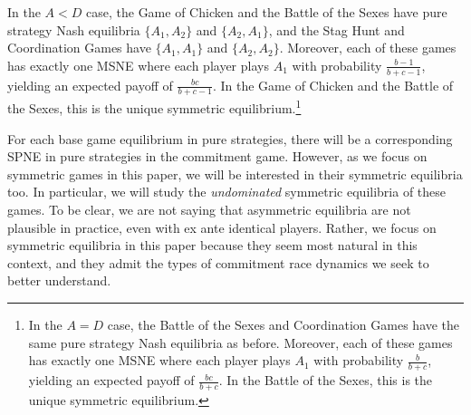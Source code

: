 \documentclass[letterpaper]{article}
\newcommand{\bparam}{b}
\newcommand{\cparam}{c}
\theoremstyle{definition}
\begin{document}
In the $A<D$ case, the Game of Chicken and the Battle of the Sexes have pure strategy Nash equilibria $\{A_1,A_2\}$ and $\{A_2,A_1\}$, and the Stag Hunt and Coordination Games have $\{A_1,A_1\}$ and $\{A_2,A_2\}$. Moreover, each of these games has exactly one MSNE where each player plays $A_1$ with probability $\frac{\bparam-1}{\bparam+\cparam-1}$, yielding an expected payoff of $\frac{\bparam\cparam}{\bparam+\cparam-1}$. In the Game of Chicken and the Battle of the Sexes, this is the unique symmetric equilibrium.\footnote{In the $A=D$ case, the Battle of the Sexes and Coordination Games have the same pure strategy Nash equilibria as before. Moreover, each of these games has exactly one MSNE where each player plays $A_1$ with probability $\frac{\bparam}{\bparam+\cparam}$, yielding an expected payoff of $\frac{\bparam\cparam}{\bparam+\cparam}$. In the Battle of the Sexes, this is the unique symmetric equilibrium.}

For each base game equilibrium in pure strategies, there will be a corresponding SPNE in pure strategies in the commitment game. However, as we focus on symmetric games in this paper, we will be interested in their symmetric equilibria too. In particular, we will study the \textit{undominated} symmetric equilibria of these games. To be clear, we are not saying that asymmetric equilibria are not plausible in practice, even with ex ante identical players. Rather, we focus on symmetric equilibria in this paper because they seem most natural in this context, and they admit the types of commitment race dynamics we seek to better understand.




\end{document}
